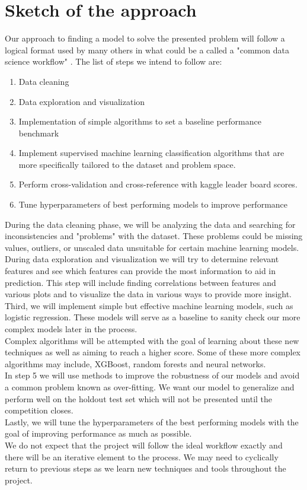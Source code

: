 \documentclass{llncs}
\begin{document}
\section{Sketch of the approach}
Our approach to finding a model to solve the presented problem will follow a logical format used by many others in what could be a called a "common data science workflow" \cite{ref_url2}. The list of steps we intend to follow are:

\begin{enumerate}
\item Data cleaning
\item Data exploration and visualization
\item Implementation of simple algorithms to set a baseline performance benchmark
\item Implement supervised machine learning classification algorithms that are more specifically tailored to the dataset and problem space.
\item Perform cross-validation and cross-reference with kaggle leader board scores. 
\item Tune hyperparameters of best performing models to improve performance
\end{enumerate}

During the data cleaning phase, we will be analyzing the data and searching for inconsistencies and "problems" with the dataset. These problems could be missing values, outliers, or unscaled data unsuitable for certain machine learning models. \\
During data exploration and visualization we will try to determine relevant features and see which features can provide the most information to aid in prediction. This step will include finding correlations between features and various plots and to visualize the data in various ways to provide more insight.
Third, we will implement simple but effective machine learning models, such as logistic regression. These models will serve as a baseline to sanity check our more complex models later in the process. \\
Complex algorithms will be attempted with the goal of learning about these new techniques as well as aiming to reach a higher score. Some of these more complex algorithms may include, XGBoost, random forests and neural networks. \\
In step 5 we will use methods to improve the robustness of our models and avoid a common problem known as over-fitting. We want our model to generalize and perform well on the holdout test set which will not be presented until the competition closes. \\
Lastly, we will tune the hyperparameters of the best performing models with the goal of improving performance as much as possible. \\
We do not expect that the project will follow the ideal workflow exactly and there will be an iterative element to the process. We may need to cyclically return to previous steps as we learn new techniques and tools throughout the project.
\end{document}
